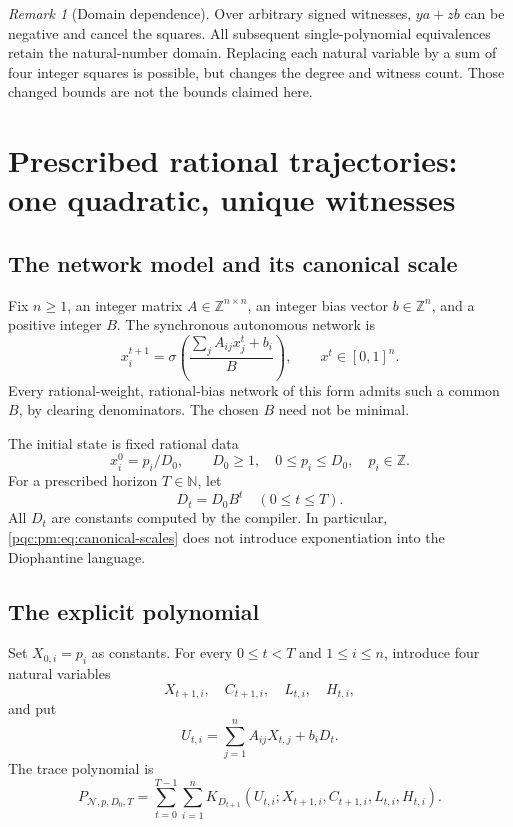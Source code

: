 \documentclass[11pt,letterpaper]{article}
\numberwithin{equation}{section}
\theoremstyle{definition}
\theoremstyle{remark}
\newtheorem{remark}[theorem]{Remark}
\newcommand{\N}{\mathbb N}
\newcommand{\Z}{\mathbb Z}
\newcommand{\srcmark}[1]{\par\noindent{\small\itshape [source~#1]}\par}
\newcommand{\NNet}{\mathcal N}
\begin{document}
\begin{remark}[Domain dependence]
Over arbitrary signed witnesses, $ya+zb$ can be negative and cancel the squares.
All subsequent single-polynomial equivalences retain the natural-number domain.
Replacing each natural variable by a sum of four integer squares is possible,
but changes the degree and witness count. Those changed bounds are not the
bounds claimed here.
\end{remark}

\section{Prescribed rational trajectories: one quadratic, unique witnesses}
\label{pqc:pm:sec:trace}
\srcmark{15}

\subsection{The network model and its canonical scale}

Fix $n\geq1$, an integer matrix $A\in\Z^{n\times n}$, an integer bias vector
$b\in\Z^n$, and a positive integer $B$. The synchronous autonomous network is
\begin{equation}\label{pqc:pm:eq:network}
 x^{t+1}_i=\sigma\left(\frac{\sum_j A_{ij}x^t_j+b_i}{B}\right),
 \qquad x^t\in[0,1]^n.
\end{equation}
Every rational-weight, rational-bias network of this form admits such a common
$B$, by clearing denominators. The chosen $B$ need not be minimal.

The initial state is fixed rational data
\[
 x^0_i=p_i/D_0,\qquad D_0\geq1,\quad 0\leq p_i\leq D_0,
 \quad p_i\in\Z.
\]
For a prescribed horizon $T\in\N$, let
\begin{equation}\label{pqc:pm:eq:canonical-scales}
 D_t=D_0B^t\quad(0\leq t\leq T).
\end{equation}
All $D_t$ are constants computed by the compiler. In particular,
\eqref{pqc:pm:eq:canonical-scales} does not introduce exponentiation into the
Diophantine language.

\subsection{The explicit polynomial}

Set $X_{0,i}=p_i$ as constants. For every $0\leq t<T$ and $1\leq i\leq n$,
introduce four natural variables
\[
 X_{t+1,i},\quad C_{t+1,i},\quad L_{t,i},\quad H_{t,i},
\]
and put
\begin{equation}\label{pqc:pm:eq:Utrace}
 U_{t,i}=\sum_{j=1}^n A_{ij}X_{t,j}+b_iD_t.
\end{equation}
The trace polynomial is
\begin{equation}\label{pqc:pm:eq:trace-poly}
 P_{\NNet,p,D_0,T}
 =\sum_{t=0}^{T-1}\sum_{i=1}^n
 K_{D_{t+1}}(U_{t,i};X_{t+1,i},C_{t+1,i},L_{t,i},H_{t,i}).
\end{equation}
\end{document}

